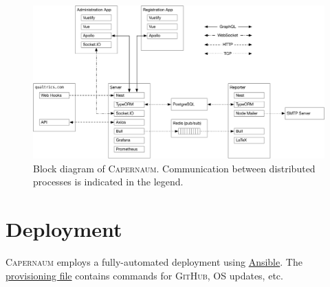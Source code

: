 \documentclass{article}
\newcommand{\ghsrc}[2]{\href{https://github.com/quantum-bits/capernaum/blob/development/#1}{#2}}
\newcommand{\caper}{\textsc{Capernaum}}
\newcommand{\gh}{\textsc{GitHub}}
\begin{document}
\begin{figure}
  \centering
  \includegraphics[width=\textwidth]{block-diagram}
  \caption{Block diagram of \caper.
    Communication between distributed processes is indicated in the legend.}
  \label{fig:block-diagram}
\end{figure}


\section{Deployment}
\label{sec:deployment}

\caper{} employs a fully-automated deployment
using \href{https://www.ansible.com/}{Ansible}.
The \ghsrc{ansible/provision.yaml}{provisioning file} contains commands for \gh{}, OS updates, etc.
\end{document}

